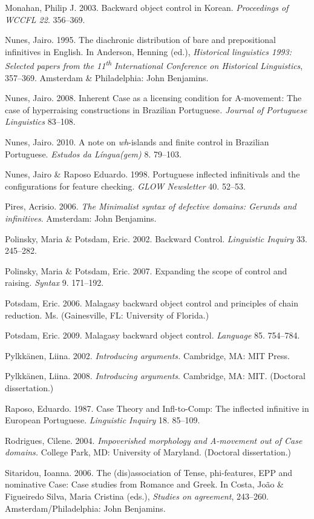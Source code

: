 \documentclass[output=paper]{langsci/langscibook}
\begin{document}
Monahan, Philip J. 2003. Backward object control in Korean. \textit{Proceedings of WCCFL 22}. 356–369.

Nunes, Jairo. 1995. The diachronic distribution of bare and prepositional infinitives in English. In Anderson, Henning (ed.), \textit{Historical linguistics 1993: Selected papers from the 11}\textit{\textsuperscript{th} }\textit{International Conference on Historical Linguistics}, 357–369. Amsterdam \& Philadelphia: John Benjamins. 

Nunes, Jairo. 2008. Inherent Case as a licensing condition for A-movement: The case of hyperraising constructions in Brazilian Portuguese\textit{. Journal of Portuguese Linguistics} 83–108. 

Nunes, Jairo. 2010. A note on \textit{wh}{}-islands and finite control in Brazilian Portuguese. \textit{Estudos da Língua(gem)} 8. 79–103. 

Nunes, Jairo \& Raposo Eduardo. 1998. Portuguese inflected infinitivals and the configurations for feature checking. \textit{GLOW Newsletter} 40. 52–53.

Pires, Acrisio. 2006. \textit{The Minimalist syntax of defective domains: Gerunds and infinitives}. Amsterdam: John Benjamins. 

Polinsky, Maria \& Potsdam, Eric. 2002. Backward Control. \textit{Linguistic Inquiry} 33. 245–282. 

Polinsky, Maria \& Potsdam, Eric. 2007. Expanding the scope of control and raising. \textit{Syntax} 9. 171–192.

Potsdam, Eric. 2006. Malagasy backward object control and principles of chain reduction. Ms. (Gainesville, FL: University of Florida.) 

Potsdam, Eric. 2009. Malagasy backward object control. \textit{Language} 85. 754–784. 

Pylkkänen, Liina. 2002. \textit{Introducing arguments.} Cambridge, MA: MIT Press.

Pylkkänen, Liina. 2008. \textit{Introducing arguments}. Cambridge, MA: MIT. (Doctoral dissertation.)

Raposo, Eduardo. 1987. Case Theory and Infl-to-Comp: The inflected infinitive in European Portuguese. \textit{Linguistic Inquiry} 18. 85–109.

Rodrigues, Cilene. 2004. \textit{Impoverished morphology and A-movement out of Case domains.} College Park, MD: University of Maryland. (Doctoral dissertation.)

Sitaridou, Ioanna. 2006. The (dis)association of Tense, phi-features, EPP and nominative Case: Case studies from Romance and Greek. In Costa, João \& Figueiredo Silva, Maria Cristina (eds.), \textit{Studies on agreement}, 243–260. Amsterdam/Philadelphia: John Benjamins.
\end{document}
